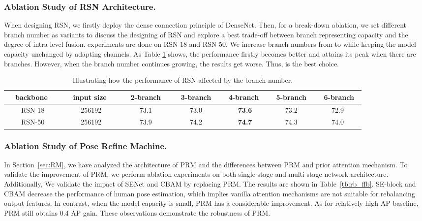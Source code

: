 \documentclass[runningheads]{llncs}
\begin{document}
\subsubsection{Ablation Study of RSN Architecture.}\label{sec:branch}
When designing RSN, we firstly deploy the dense connection principle of DenseNet. Then, for a break-down ablation, we set different branch number as variants to discuss the designing of RSN and explore a best trade-off between branch representing capacity and the degree of intra-level fusion. experiments are done on RSN-18 and RSN-50. We increase branch numbers from  to  while keeping the model capacity unchanged by adapting channels. As Table \ref{tb:branch} shows, the performance firstly becomes better and attains its peak when there are  branches. However, when the branch number continues growing, the results get worse. Thus,  is the best choice.
\begin{table}[h]

  \centering
  \caption{Illustrating how the performance of RSN affected by the branch number.}
  \begin{tabular}{c|c|c|c|c|c|c}
\hline\hline
    ~~backbone ~~& ~~input size ~~&~ 2-branch ~&~ 3-branch ~& ~4-branch ~& ~5-branch~ &~ 6-branch~ \\
    \hline
    RSN-18 &256192 &73.1 & 73.0  &\textbf{73.6} &73.2 &72.9        \\
    RSN-50 &256192 &73.9 & 74.2  &\textbf{74.7} &74.3 &74.0        \\
    \hline\hline
  \end{tabular}
  
  \label{tb:branch}
\end{table}





\subsubsection{Ablation Study of Pose Refine Machine.} \label{sec:rb_ffb}
In Section~\ref{sec:RM}, we have analyzed the architecture of PRM and the differences between PRM and prior attention mechanism. To validate the improvement of PRM, we perform ablation experiments on both single-stage and multi-stage network architecture. Additionally, We validate the impact of SENet and CBAM by replacing PRM. The results are shown in Table~\ref{tb:rb_ffb}. SE-block and CBAM decrease the performance of human pose estimation, which implies vanilla attention mechanisms are not suitable for rebalancing output features. In contrast, when the model capacity is small, PRM has a considerable improvement. As for relatively high AP baseline, PRM still obtains 0.4 AP gain. These observations demonstrate the robustness of PRM.  
\end{document}

